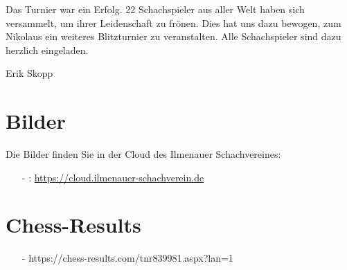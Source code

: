\documentclass[a4paper,ngerman]{tui-algo-seminar}
\begin{document}
Das Turnier war ein Erfolg. 22 Schachspieler aus aller Welt haben sich versammelt, um ihrer Leidenschaft zu frönen. Dies hat uns dazu bewogen, zum Nikolaus ein weiteres Blitzturnier zu veranstalten. Alle Schachspieler sind dazu herzlich eingeladen.

Erik Skopp

\section{Bilder}
Die Bilder finden Sie in der Cloud des Ilmenauer Schachvereines: 
\begin{itemize}
	\item[-]: \url{https://cloud.ilmenauer-schachverein.de}
\end{itemize}

\section{Chess-Results}
\begin{itemize}
	\item[-] https://chess-results.com/tnr839981.aspx?lan=1
\end{itemize}
\clearpage
\end{document}

